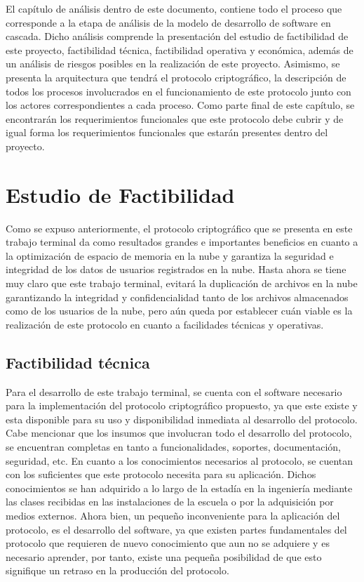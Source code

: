 
El capítulo de análisis dentro de este documento, contiene todo el proceso que corresponde a la etapa de análisis de la modelo de desarrollo de software en cascada. Dicho análisis comprende la presentación del estudio de factibilidad de este proyecto, factibilidad técnica, factibilidad operativa y económica, además de un análisis de riesgos posibles en la realización de este proyecto. Asimismo, se presenta la arquitectura que tendrá el protocolo criptográfico, la descripción de todos los procesos involucrados en el funcionamiento de este protocolo junto con los actores correspondientes a cada proceso. Como parte final de este capítulo, se encontrarán los requerimientos funcionales que este protocolo debe cubrir y de igual forma los requerimientos funcionales que estarán presentes dentro del proyecto. 


\section{Estudio de Factibilidad}

Como se expuso anteriormente, el protocolo criptográfico que se presenta en este trabajo terminal da como resultados grandes e importantes beneficios en cuanto a la optimización de espacio de memoria en la nube y garantiza la seguridad e integridad de los datos de usuarios registrados en la nube. Hasta ahora se tiene muy claro que este trabajo terminal, evitará la duplicación de archivos en la nube garantizando la integridad y confidencialidad tanto de los archivos almacenados como de los usuarios de la nube, pero aún queda por establecer cuán viable es la realización de este protocolo en cuanto a facilidades técnicas y operativas.


\subsection{Factibilidad técnica}

Para el desarrollo de este trabajo terminal, se cuenta con el software necesario para la implementación del protocolo criptográfico propuesto, ya que este existe y esta disponible para su uso y disponibilidad inmediata al desarrollo del protocolo. Cabe mencionar que los insumos que involucran todo el desarrollo del protocolo, se encuentran completas en tanto a funcionalidades, soportes, documentación, seguridad, etc. 
En cuanto a los conocimientos necesarios al protocolo, se cuentan con los suficientes que este protocolo necesita para su aplicación. Dichos conocimientos se han adquirido a lo largo de la estadía en la ingeniería mediante las clases recibidas en las instalaciones de la escuela o por la adquisición por medios externos. Ahora bien, un pequeño inconveniente para la aplicación del protocolo, es el desarrollo del software, ya que existen partes fundamentales del protocolo que requieren de nuevo conocimiento que aun no se adquiere y es necesario aprender, por tanto, existe una pequeña posibilidad de que esto signifique un retraso en la producción del protocolo. 

